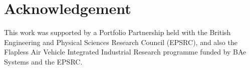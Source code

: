\documentclass[a4paper,12pt]{article}
\theoremstyle{remark}
\begin{document}
\section{Acknowledgement}  \noindent
This work was supported by a Portfolio Partnership held with the British Engineering and Physical Sciences Research Council (EPSRC), and also the Flapless Air Vehicle Integrated Industrial Research programme funded by BAe Systems and the EPSRC.




\newpage
\listoffigures
\end{document}
